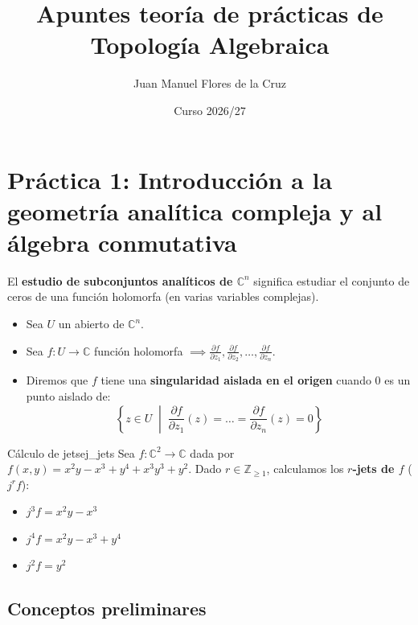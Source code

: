\documentclass[11pt,a4paper]{article}
\title{\Huge \textbf{Apuntes teoría de prácticas de Topología Algebraica}}
\author{\Large Juan Manuel Flores de la Cruz}
\date{Curso 2026/27}
\begin{document}
\maketitle
\thispagestyle{empty}
\newpage
\tableofcontents
\newpage

\section{Práctica 1: Introducción a la geometría analítica compleja y al álgebra conmutativa}

El \textbf{estudio de subconjuntos analíticos de $\mathbb{C}^n$} significa estudiar el conjunto de ceros de una función holomorfa (en varias variables complejas).

\begin{itemize}
    \item Sea $U$ un abierto de $\mathbb{C}^n$.
    \item Sea $f: U \to \mathbb{C}$ función holomorfa $\implies \frac{\partial f}{\partial z_1}, \frac{\partial f}{\partial z_2}, \dots, \frac{\partial f}{\partial z_n}$.
    \item Diremos que $f$ tiene una \textbf{singularidad aislada en el origen} cuando $0$ es un punto aislado de:
    $$ \left\{ z \in U \;\middle|\; \frac{\partial f}{\partial z_1}(z) = \dots = \frac{\partial f}{\partial z_n}(z) = 0 \right\} $$
\end{itemize}

\begin{observacion}{Cálculo de jets}{ej_jets}
Sea $f: \mathbb{C}^2 \to \mathbb{C}$ dada por $f(x,y) = x^2y - x^3 + y^4 + x^3y^3 + y^2$.
Dado $r \in \mathbb{Z}_{\ge 1}$, calculamos los \textbf{$r$-jets de $f$} ($j^r f$):
\begin{itemize}
    \item $j^3 f = x^2y - x^3$
    \item $j^4 f = x^2y - x^3 + y^4$
    \item $j^2 f = y^2$
\end{itemize}
\end{observacion}

\subsection*{Conceptos preliminares}
\end{document}
